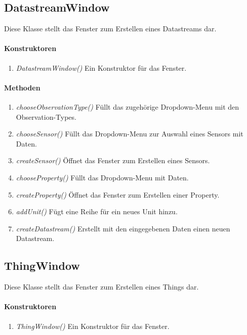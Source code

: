 \subsection*{DatastreamWindow}\label{DatastreamWindow}
Diese Klasse stellt das Fenster zum Erstellen eines Datastreams dar.

\paragraph{Konstruktoren}
\begin{enumerate}[+]
	\item \textit{DatastreamWindow()} Ein Konstruktor für das Fenster.
\end{enumerate}

\paragraph{Methoden}

\begin{enumerate}[+]
	\item \textit{chooseObservationType()} Füllt das zugehörige Dropdown-Menu mit den Observation-Types.
	\item \textit{chooseSensor()} Füllt das Dropdown-Menu zur Auswahl eines Sensors mit Daten.
	\item \textit{createSensor()} Öffnet das Fenster zum Erstellen eines Sensors.
	\item \textit{chooseProperty()} Füllt das Dropdown-Menu mit Daten.
	\item \textit{createProperty()} Öffnet das Fenster zum Erstellen einer Property.
	\item \textit{addUnit()} Fügt eine Reihe für ein neues Unit hinzu.
	\item \textit{createDatastream()} Erstellt mit den eingegebenen Daten einen neuen Datastream.
\end{enumerate}



\subsection*{ThingWindow}\label{ThingWindow}
Diese Klasse stellt das Fenster zum Erstellen eines Things dar.

\paragraph{Konstruktoren}
\begin{enumerate}[+]
	\item \textit{ThingWindow()} Ein Konstruktor für das Fenster.
\end{enumerate}

